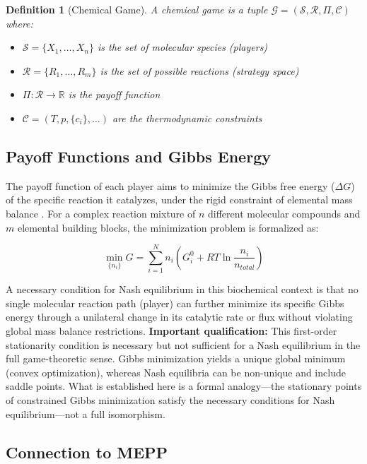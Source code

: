 \documentclass[12pt,a4paper]{article}
\newtheorem{definition}{Definition}
\theoremstyle{remark}
\begin{document}
\begin{definition}[Chemical Game]
A chemical game is a tuple $\mathcal{G} = (\mathcal{S}, \mathcal{R}, \Pi, \mathcal{C})$ where:
\begin{itemize}
    \item $\mathcal{S} = \{X_1, \ldots, X_n\}$ is the set of molecular species (players)
    \item $\mathcal{R} = \{R_1, \ldots, R_m\}$ is the set of possible reactions (strategy space)
    \item $\Pi: \mathcal{R} \to \mathbb{R}$ is the payoff function
    \item $\mathcal{C} = (T, p, \{c_i\}, \ldots)$ are the thermodynamic constraints
\end{itemize}
\end{definition}

\subsection{Payoff Functions and Gibbs Energy}

The payoff function of each player aims to minimize the Gibbs free energy ($\Delta G$) of the specific reaction it catalyzes, under the rigid constraint of elemental mass balance \citep{MetabolicNash}. For a complex reaction mixture of $n$ different molecular compounds and $m$ elemental building blocks, the minimization problem is formalized as:

\begin{equation}
\min_{\{n_i\}} G = \sum_{i=1}^{N} n_i \left( G_i^0 + RT \ln\frac{n_i}{n_{total}} \right)
\end{equation}

A necessary condition for Nash equilibrium in this biochemical context is that no single molecular reaction path (player) can further minimize its specific Gibbs energy through a unilateral change in its catalytic rate or flux without violating global mass balance restrictions. \textbf{Important qualification:} This first-order stationarity condition is necessary but not sufficient for a Nash equilibrium in the full game-theoretic sense. Gibbs minimization yields a unique global minimum (convex optimization), whereas Nash equilibria can be non-unique and include saddle points. What is established here is a formal analogy---the stationary points of constrained Gibbs minimization satisfy the necessary conditions for Nash equilibrium---not a full isomorphism.

\subsection{Connection to MEPP}
\end{document}
